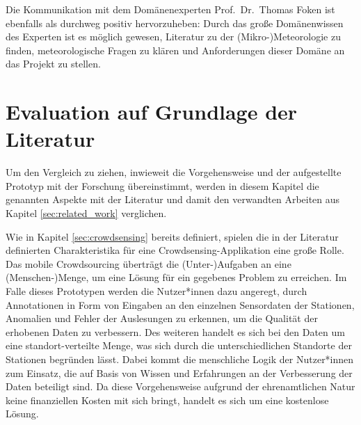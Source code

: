 Die Kommunikation mit dem Domänenexperten Prof.\ Dr.\ Thomas Foken ist ebenfalls als durchweg positiv hervorzuheben: Durch das große Domänenwissen des Experten ist es möglich gewesen, Literatur zu der (Mikro-)Meteorologie zu finden, meteorologische Fragen zu klären und Anforderungen dieser Domäne an das Projekt zu stellen.

\section{Evaluation auf Grundlage der Literatur}
\label{sec:evaluationliteratur}
Um den Vergleich zu ziehen, inwieweit die Vorgehensweise und der aufgestellte Prototyp mit der Forschung übereinstimmt, werden in diesem Kapitel die genannten Aspekte mit der Literatur und damit den verwandten Arbeiten aus Kapitel \ref{sec:related_work} verglichen.

Wie in Kapitel \ref{sec:crowdsensing} bereits definiert, spielen die in der Literatur definierten Charakteristika für eine Crowdsensing-Applikation eine große Rolle. Das mobile Crowdsourcing überträgt die (Unter-)Aufgaben an eine (Menschen-)Menge, um eine Lösung für ein gegebenes Problem zu erreichen. Im Falle dieses Prototypen werden die Nutzer*innen dazu angeregt, durch Annotationen in Form von Eingaben an den einzelnen Sensordaten der Stationen, Anomalien und Fehler der Auslesungen zu erkennen, um die Qualität der erhobenen Daten zu verbessern. Des weiteren handelt es sich bei den Daten um eine standort-verteilte Menge, was sich durch die unterschiedlichen Standorte der Stationen begründen lässt. Dabei kommt die menschliche Logik der Nutzer*innen zum Einsatz, die auf Basis von Wissen und Erfahrungen an der Verbesserung der Daten beteiligt sind. Da diese Vorgehensweise aufgrund der ehrenamtlichen Natur keine finanziellen Kosten mit sich bringt, handelt es sich um eine kostenlose Lösung.

